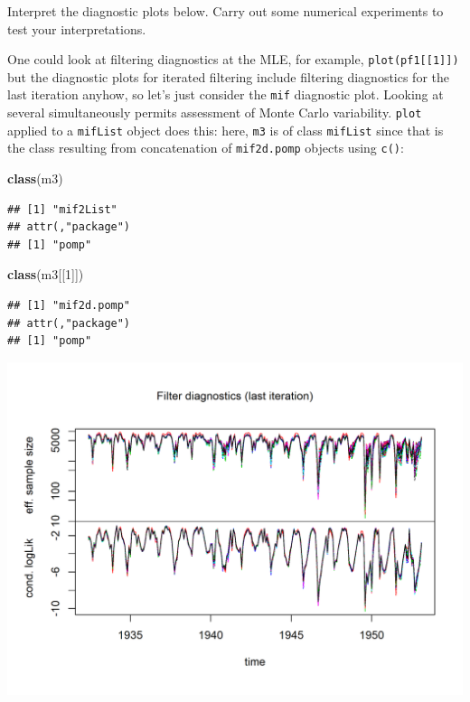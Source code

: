 \documentclass[]{article}
\newenvironment{Shaded}{\begin{snugshade}}{\end{snugshade}}
\newcommand{\KeywordTok}[1]{\textcolor[rgb]{0.13,0.29,0.53}{\textbf{#1}}}
\newcommand{\DecValTok}[1]{\textcolor[rgb]{0.00,0.00,0.81}{#1}}
\newcommand{\OperatorTok}[1]{\textcolor[rgb]{0.81,0.36,0.00}{\textbf{#1}}}
\newcommand{\NormalTok}[1]{#1}
\begin{document}
Interpret the diagnostic plots below. Carry out some numerical
experiments to test your interpretations.

One could look at filtering diagnostics at the MLE, for example,
\texttt{plot(pf1{[}{[}1{]}{]})} but the diagnostic plots for iterated
filtering include filtering diagnostics for the last iteration anyhow,
so let's just consider the \texttt{mif} diagnostic plot. Looking at
several simultaneously permits assessment of Monte Carlo variability.
\texttt{plot} applied to a \texttt{mifList} object does this: here,
\texttt{m3} is of class \texttt{mifList} since that is the class
resulting from concatenation of \texttt{mif2d.pomp} objects using
\texttt{c()}:

\begin{Shaded}
\begin{Highlighting}[]
\KeywordTok{class}\NormalTok{(m3)}
\end{Highlighting}
\end{Shaded}

\begin{verbatim}
## [1] "mif2List"
## attr(,"package")
## [1] "pomp"
\end{verbatim}

\begin{Shaded}
\begin{Highlighting}[]
\KeywordTok{class}\NormalTok{(m3[[}\DecValTok{1}\NormalTok{]])}
\end{Highlighting}
\end{Shaded}

\begin{verbatim}
## [1] "mif2d.pomp"
## attr(,"package")
## [1] "pomp"
\end{verbatim}

\begin{Shaded}
\end{Shaded}

\begin{center}\includegraphics{figure/sp500-mif_diagnostics-1} \end{center}
\end{document}
